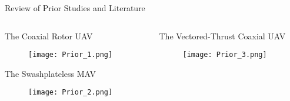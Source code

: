 \documentclass[10pt,xcolor={x11names}]{beamer}
\begin{document}
\begin{frame}{Review of Prior Studies and Literature}
    \begin{columns}
        \begin{column}{0.5\linewidth}
            \begin{block}{The Coaxial Rotor UAV}
                \begin{figure}
                    \centering
                    \texttt{[image: Prior\_1.png]}
                \end{figure}
            \end{block}
            \begin{alertblock}{The Swashplateless MAV}
                \begin{figure}
                    \centering
                    \texttt{[image: Prior\_2.png]}
                \end{figure}
            \end{alertblock}
        \end{column}
        \begin{column}{0.5\linewidth}
            \begin{exampleblock}{The Vectored-Thrust Coaxial UAV}
                \begin{figure}
                    \centering
                    \texttt{[image: Prior\_3.png]}
                \end{figure}
            \end{exampleblock}
        \end{column}
    \end{columns}
\end{frame}
\end{document}
